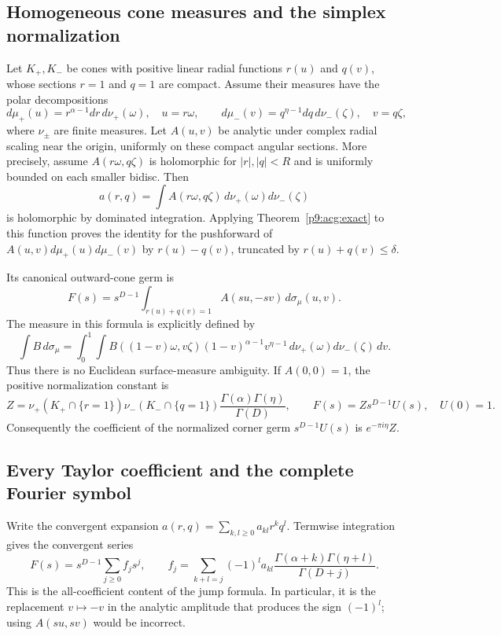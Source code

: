 \documentclass[11pt,a4paper]{article}
\theoremstyle{definition}
\theoremstyle{remark}
\numberwithin{equation}{section}
\begin{document}
\subsection{Homogeneous cone measures and the simplex normalization}

Let $K_+,K_-$ be cones with positive linear radial functions $r(u)$
and $q(v)$, whose sections $r=1$ and $q=1$ are compact. Assume their
measures have the polar decompositions
\[
 d\mu_+(u)=r^{\alpha-1}dr\,d\nu_+(\omega),\quad u=r\omega,
 \qquad
 d\mu_-(v)=q^{\eta-1}dq\,d\nu_-(\zeta),\quad v=q\zeta,
\]
where $\nu_\pm$ are finite measures. Let $A(u,v)$ be analytic under
complex radial scaling near the origin, uniformly on these compact
angular sections. More precisely, assume $A(r\omega,q\zeta)$ is
holomorphic for $|r|,|q|<R$ and is uniformly bounded on each smaller
bidisc. Then
\[
 a(r,q)=\int A(r\omega,q\zeta)\,d\nu_+(\omega)d\nu_-(\zeta)
\]
is holomorphic by dominated integration. Applying
Theorem~\ref{p9:acg:exact} to this function proves the identity for the
pushforward of $A(u,v)d\mu_+(u)d\mu_-(v)$ by $r(u)-q(v)$, truncated
by $r(u)+q(v)\leq\delta$.

Its canonical outward-cone germ is
\begin{equation}\label{p9:acg:cone-F}
 F(s)=s^{D-1}\int_{r(u)+q(v)=1} A(su,-sv)\,d\sigma_{\mu}(u,v).
\end{equation}
The measure in this formula is explicitly defined by
\[
 \int B\,d\sigma_\mu=
 \int_0^1\!\int B((1-v)\omega,v\zeta)
 (1-v)^{\alpha-1}v^{\eta-1}
 \,d\nu_+(\omega)d\nu_-(\zeta)\,dv.
\]
Thus there is no Euclidean surface-measure ambiguity. If $A(0,0)=1$,
the positive normalization constant is
\begin{equation}\label{p9:acg:normalization}
 Z=\nu_+(K_+\cap\{r=1\})\nu_-(K_-\cap\{q=1\})
       \frac{\Gamma(\alpha)\Gamma(\eta)}{\Gamma(D)},
 \qquad F(s)=Zs^{D-1}U(s),\quad U(0)=1.
\end{equation}
Consequently the coefficient of the normalized corner germ
$s^{D-1}U(s)$ is $e^{-\pi i\eta}Z$.

\subsection{Every Taylor coefficient and the complete Fourier symbol}

Write the convergent expansion $a(r,q)=\sum_{k,l\geq0}a_{kl}r^kq^l$.
Termwise integration gives the convergent series
\begin{equation}\label{p9:acg:all-coefficients}
 F(s)=s^{D-1}\sum_{j\geq0}f_js^j,\qquad
 f_j=\sum_{k+l=j}(-1)^l a_{kl}
       \frac{\Gamma(\alpha+k)\Gamma(\eta+l)}{\Gamma(D+j)}.
\end{equation}
This is the all-coefficient content of the jump formula. In particular,
it is the replacement $v\mapsto-v$ in the analytic amplitude that
produces the sign $(-1)^l$; using $A(su,sv)$ would be incorrect.
\end{document}
